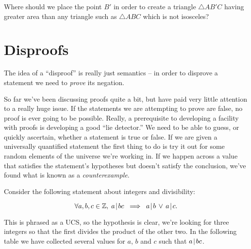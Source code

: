 \begin{exer}
Where should we place the point $B'$ in order to create a triangle  
$\triangle AB'C$ having
greater area than any triangle such as $\triangle ABC$ which is not isosceles?

\begin{center}

\end{center}

\end{exer}
\clearpage




\newpage

\section{Disproofs}
\label{sec:disproofs}

The idea of a ``disproof'' is really just semantics -- in order to
disprove a statement we need to \emph{prove} its negation.  

So far we've been discussing proofs quite a bit, but have paid
very little attention to a really huge issue.  If the statements
we are attempting to prove are false, no proof is ever going to
be possible.  Really, a prerequisite to developing a facility with
proofs is developing a good ``lie detector.''   We need to be able 
to guess, or quickly ascertain, whether a statement is true or false.
If we are given a universally quantified statement the first thing to
do is try it out for some random elements of the universe we're working
in.  If we happen across a value that satisfies the statement's hypotheses
but doesn't satisfy the conclusion, we've found what is known as a 
\emph{counterexample}.  

Consider the following statement about integers and divisibility:

\begin{conj} \label{conj:prim}
\[ \forall a,b,c \in {\mathbb Z}, \; a \!\mid\! bc \; \implies \; a \!\mid\! b \,
\lor \, a \!\mid\! c. \]
\end{conj}

This is phrased as a UCS, so the hypothesis is clear, we're looking 
for three integers so that the first divides the product of the other
two. In the following table we have collected several values for
$a$, $b$ and $c$ such that $a \!\mid\! bc$.

